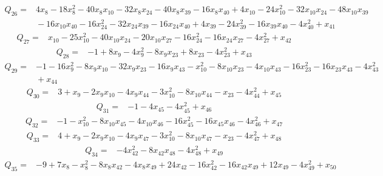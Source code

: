 {%
\begin{align*}
 Q_{26}={}&4x_{8} -18x_{8}^{2} -40x_{8}x_{10} -32x_{8}x_{24} -40x_{8}x_{39} -16x_{8}x_{40} +4x_{10} -24x_{10}^{2} -32x_{10}x_{24} -48x_{10}x_{39}\\
 &{}-16x_{10}x_{40} -16x_{24}^{2} -32x_{24}x_{39} -16x_{24}x_{40} +4x_{39} -24x_{39}^{2} -16x_{39}x_{40} -4x_{40}^{2} +x_{41}
\end{align*}
\begin{align*}
 Q_{27}={}&x_{10} -25x_{10}^{2} -40x_{10}x_{24} -20x_{10}x_{27} -16x_{24}^{2} -16x_{24}x_{27} -4x_{27}^{2} +x_{42}
\end{align*}
\begin{align*}
 Q_{28}={}&-1 +8x_{9} -4x_{9}^{2} -8x_{9}x_{23} +8x_{23} -4x_{23}^{2} +x_{43}
\end{align*}
\begin{align*}
 Q_{29}={}&-1 -16x_{9}^{2} -8x_{9}x_{10} -32x_{9}x_{23} -16x_{9}x_{43} -x_{10}^{2} -8x_{10}x_{23} -4x_{10}x_{43} -16x_{23}^{2} -16x_{23}x_{43} -4x_{43}^{2}\\
 &{}+x_{44}
\end{align*}
\begin{align*}
 Q_{30}={}&3 +x_{9} -2x_{9}x_{10} -4x_{9}x_{44} -3x_{10}^{2} -8x_{10}x_{44} -x_{23} -4x_{44}^{2} +x_{45}
\end{align*}
\begin{align*}
 Q_{31}={}&-1 -4x_{45} -4x_{45}^{2} +x_{46}
\end{align*}
\begin{align*}
 Q_{32}={}&-1 -x_{10}^{2} -8x_{10}x_{45} -4x_{10}x_{46} -16x_{45}^{2} -16x_{45}x_{46} -4x_{46}^{2} +x_{47}
\end{align*}
\begin{align*}
 Q_{33}={}&4 +x_{9} -2x_{9}x_{10} -4x_{9}x_{47} -3x_{10}^{2} -8x_{10}x_{47} -x_{23} -4x_{47}^{2} +x_{48}
\end{align*}
\begin{align*}
 Q_{34}={}&-4x_{42}^{2} -8x_{42}x_{48} -4x_{48}^{2} +x_{49}
\end{align*}
\begin{align*}
 Q_{35}={}&-9 +7x_{8} -x_{8}^{2} -8x_{8}x_{42} -4x_{8}x_{49} +24x_{42} -16x_{42}^{2} -16x_{42}x_{49} +12x_{49} -4x_{49}^{2} +x_{50}

\end{align*}}
